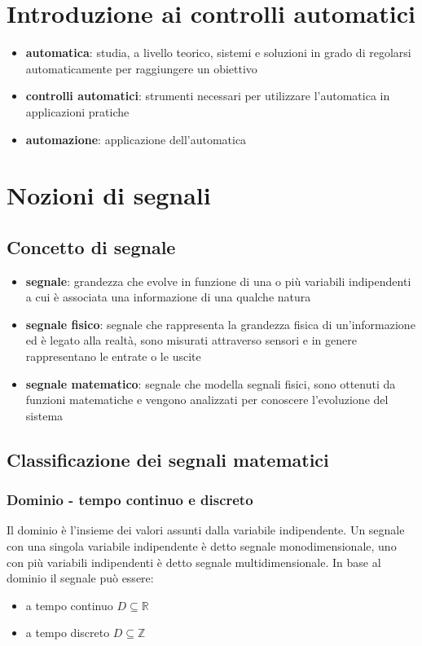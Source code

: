 \section{Introduzione ai controlli automatici}
\begin{itemize}
	\item \textbf{automatica}: studia, a livello teorico, sistemi e soluzioni in grado di regolarsi automaticamente per raggiungere un obiettivo
	\item \textbf{controlli automatici}: strumenti necessari per utilizzare l'automatica in applicazioni pratiche
	\item \textbf{automazione}: applicazione dell'automatica
\end{itemize}

\section{Nozioni di segnali}
\subsection{Concetto di segnale}
\begin{itemize}
	\item \textbf{segnale}: grandezza che evolve in funzione di una o più variabili indipendenti a cui è associata una informazione
	di una qualche natura
	\item \textbf{segnale fisico}: segnale che rappresenta la grandezza fisica di un'informazione ed è legato alla realtà, sono
	misurati attraverso sensori e in genere rappresentano le entrate o le uscite
	\item \textbf{segnale matematico}: segnale che modella segnali fisici, sono ottenuti da funzioni matematiche e vengono analizzati
	per conoscere l'evoluzione del sistema
\end{itemize}

\subsection{Classificazione dei segnali matematici}
\subsubsection*{Dominio - tempo continuo e discreto}
Il dominio è l'insieme dei valori assunti dalla variabile indipendente. Un segnale con una singola variabile indipendente è detto segnale
monodimensionale, uno con più variabili indipendenti è detto segnale multidimensionale. In base al dominio il segnale può essere:
\begin{itemize}
	\item a tempo continuo \(D \subseteq \mathbb{R}\)
	\item a tempo discreto \(D \subseteq \mathbb{Z}\)
\end{itemize}


